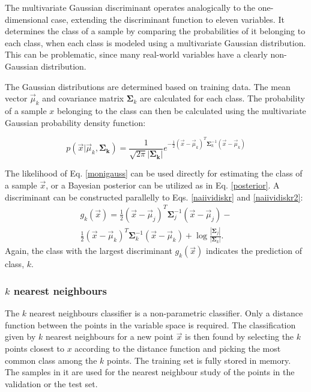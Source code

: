 \documentclass[twoside]{article}
\renewcommand{\v}[1]{\vec{#1}}
\begin{document}
\begin{multicols}{2}
The multivariate Gaussian discriminant operates analogically to the one-dimensional
case, extending the discriminant function to eleven variables. It determines the class of a sample by
comparing the probabilities of it belonging to each class, when each
class is modeled using a multivariate Gaussian distribution. This can be problematic,
since many real-world variables have a clearly non-Gaussian distribution.

The Gaussian distributions are determined based on training data.
The mean vector $\v{\mu}_k$ and covariance matrix $\mathbf{\Sigma}_k$ are calculated for each class.
The probability of a sample $x$ belonging to the class can then be calculated
using the multivariate Gaussian probability density function:

\begin{equation}\label{monigauss}
 p(\v{x}|\v{\mu}_k,\mathbf{\Sigma_k}) = \frac{1}{\sqrt{2\pi} |\mathbf{\Sigma_k}|}
 e^{-\frac{1}{2}(\v{x}-\v{\mu}_k)^T \mathbf{\Sigma}_k^{-1} (\v{x}-\v{\mu}_k)}
\end{equation}

The likelihood of Eq. \eqref{monigauss} can be used directly for estimating the class of a
sample $\v{x}$, or a Bayesian posterior can be utilized as in Eq. \eqref{posterior}. 
A discriminant can be constructed parallelly to Eqs. \eqref{naiividiskr} and \eqref{naiividiskr2}:
\begin{equation}
	\begin{aligned}
	 g_k(\v{x}) = \frac{1}{2}(\v{x}-\v{\mu}_j)^T \mathbf{\Sigma}_j^{-1} (\v{x}-\v{\mu}_j) - \\
	 \frac{1}{2}(\v{x}-\v{\mu}_k)^T \mathbf{\Sigma}_k^{-1} (\v{x}-\v{\mu}_k) 
	+\log \frac{|\mathbf{\Sigma}_j|}{|\mathbf{\Sigma}_k|}.
       \end{aligned}
\end{equation}
Again, the class with the largest discriminant $g_k(\v{x})$ indicates the prediction of class, $k$.

\subsubsection{$k$ nearest neighbours}\label{method:knn}

The $k$ nearest neighbours classifier is a non-parametric classifier. Only a
distance function between the points in the variable space is required.
The classification given by $k$ nearest neighbours for a new point $\v{x}$ is then found by 
selecting the $k$ points closest to $x$ according to the distance function and
picking the most common class among the $k$ points. The training set is fully
stored in memory. The samples in it are used for the nearest neighbour study
of the points in the validation or the test set.


\end{multicols}
\end{document}
